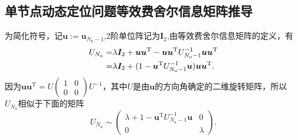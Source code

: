 \subsection{单节点动态定位问题等效费舍尔信息矩阵推导}\label{B_F_1}
为简化符号，记$\bm{u}:=\bm{u}_{N_a-1}$,2阶单位阵记为$\bm{I}_2$,由等效费舍尔信息矩阵的定义，有
\begin{align}\notag\label{eq:initial_efim}
  U_{N_a}=&\lambda \bm{I}_2+\bm{u}\bm{u}^{\textrm{T}}-\bm{u}\bm{u}^{\textrm{T}} U_{N_a-1}^{-1}\bm{u}\bm{u}^{\textrm{T}}\\
  =&\lambda \bm{I}_2+(1-\bm{u}^{\textrm{T}} U_{N_a-1}^{-1}\bm{u})\bm{u}\bm{u}^{\textrm{T}}.
\end{align}
因为$\bm{u}\bm{u}^{\textrm{T}}=U\begin{pmatrix}
                     1 & 0 \\
                     0 & 0
                   \end{pmatrix}U^{-1}$，其中$U$是由$\bm{u}$的方向角确定的二维旋转矩阵，所以
$U_{N_a}$相似于下面的矩阵
\begin{equation}
U_{N_a}\sim \begin{pmatrix}
                           \lambda+1-\bm{u}^{\textrm{T}} U_{N_a-1}^{-1}\bm{u} & 0 \\
                           0 & \lambda
                         \end{pmatrix}.
\end{equation}

